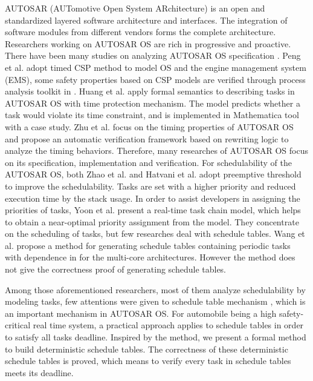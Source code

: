 \documentclass[10pt,conference]{IEEEtran}
\begin{document}
AUTOSAR (AUTomotive Open System ARchitecture) \cite{autosar} is an open and standardized layered software architecture and interfaces. The integration of software modules from different vendors forms the complete architecture. %
Researchers working on AUTOSAR OS are rich in progressive and proactive. There have been many studies on analyzing AUTOSAR OS specification \cite{DBLP:conf/isorc/AnssiTKGT11}. 
Peng et al. adopt timed CSP method to model OS and the engine management system (EMS), some safety properties based on CSP models are verified through process analysis toolkit in \cite{DBLP:conf/tase/PengHSG13}. Huang et al. \cite{DBLP:conf/icfem/HuangFHQH13} apply formal semantics to describing tasks in AUTOSAR OS with time protection mechanism. The model predicts whether a task would violate its time constraint, and is implemented in Mathematica tool with a case study. Zhu et al. \cite{DBLP:conf/tase/ZhuLSWZ13} focus on the timing properties of AUTOSAR OS and propose an automatic verification framework based on rewriting logic to analyze the timing behaviors. Therefore, many researches of AUTOSAR OS focus on its specification, implementation and verification. 
For schedulability of the AUTOSAR OS, both Zhao et al. \cite{DBLP:journals/jsa/ZhaoGZ17} and Hatvani et al. \cite{DBLP:conf/etfa/HatvaniB15} adopt preemptive threshold to improve the schedulability. Tasks are set with a higher priority and reduced execution time by the stack usage. In order to assist developers in assigning the priorities of tasks, Yoon et al. \cite{DBLP:conf/racs/YoonR14} present a real-time task chain model, which helps to obtain a near-optimal priority assignment from the model. They concentrate on the scheduling of tasks, but few researches deal with schedule tables. Wang et al. propose a method for generating schedule tables containing periodic tasks with dependence in \cite{DBLP:conf/dasip/WangCM16} for the multi-core architectures. However the method does not give the correctness proof of generating schedule tables.

Among those aforementioned researchers, most of them analyze schedulability by modeling tasks, few attentions were given to schedule table mechanism \cite{autosar}, which is an important mechanism in AUTOSAR OS. For automobile being a high safety-critical real time system, a practical approach \cite{DBLP:journals/rts/BakerS89} applies to schedule tables in order to satisfy all tasks deadline. Inspired by the method, we present a formal method to build deterministic schedule tables. The correctness of these deterministic schedule tables is proved, which means to verify every task in schedule tables meets its deadline.
\end{document}

